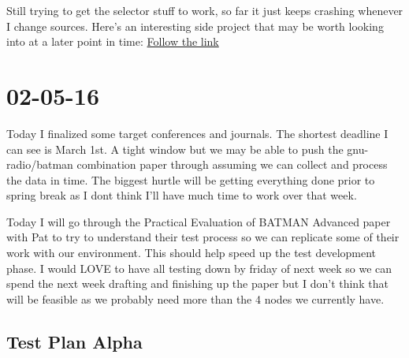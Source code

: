 \documentclass{article}
\begin{document}
{	Still trying to get the selector stuff to work, so far it just keeps crashing whenever I change
	sources. Here's an interesting side project that may be worth looking into at a later point in
	time: \href{https://github.com/pothosware/gnuradio/wiki}{Follow the link}


	\section{02-05-16}

	Today I finalized some target conferences and journals. The shortest deadline I can see
	is March 1st. A tight window but we may be able to push the gnu-radio/batman combination
	paper through assuming we can collect and process the data in time. The biggest hurtle will
	be getting everything done prior to spring break as I dont think I'll have much
	time to work over that week. 

	Today I will go through the Practical Evaluation of BATMAN Advanced paper with Pat to try to
	understand their test process so we can replicate some of their work with our environment. 
	This should help speed up the test development phase. I would LOVE to have all
	testing down by friday of next week so we can spend the next week drafting and finishing up
	the paper but I don't think that will be feasible as we probably need more than the 4 nodes
	we currently have. 

	\subsection{Test Plan Alpha}

}
\end{document}
